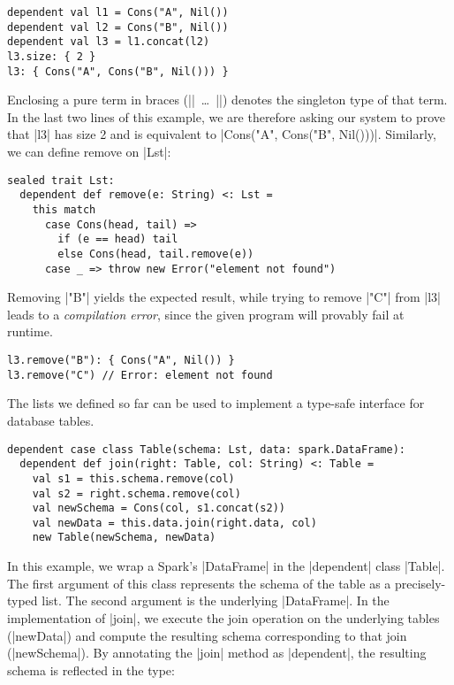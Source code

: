 \begin{lstlisting}
dependent val l1 = Cons("A", Nil())
dependent val l2 = Cons("B", Nil())
dependent val l3 = l1.concat(l2)
l3.size: { 2 }
l3: { Cons("A", Cons("B", Nil())) }
\end{lstlisting}

Enclosing a pure term in braces (|{|~\ldots{}~|}|) denotes the singleton type of that term.
In the last two lines of this example, we are therefore asking our system to prove that |l3| has size 2 and is equivalent to |Cons("A", Cons("B", Nil()))|.
Similarly, we can define remove on |Lst|:

\begin{lstlisting}
sealed trait Lst:
  dependent def remove(e: String) <: Lst =
    this match
      case Cons(head, tail) =>
        if (e == head) tail
        else Cons(head, tail.remove(e))
      case _ => throw new Error("element not found")
\end{lstlisting}

\noindent
Removing |"B"| yields the expected result, while trying to remove |"C"| from |l3| leads to a \emph{compilation error}, since the given program will provably fail at runtime.

\begin{lstlisting}
l3.remove("B"): { Cons("A", Nil()) }
l3.remove("C") // Error: element not found
\end{lstlisting}

The lists we defined so far can be used to implement a type-safe interface for database tables.

\begin{lstlisting}
dependent case class Table(schema: Lst, data: spark.DataFrame):
  dependent def join(right: Table, col: String) <: Table =
    val s1 = this.schema.remove(col)
    val s2 = right.schema.remove(col)
    val newSchema = Cons(col, s1.concat(s2))
    val newData = this.data.join(right.data, col)
    new Table(newSchema, newData)
\end{lstlisting}

\noindent
In this example, we wrap a Spark's |DataFrame| in the |dependent| class |Table|.
The first argument of this class represents the schema of the table as a precisely-typed list.
The second argument is the underlying |DataFrame|.
In the implementation of |join|, we execute the join operation on the underlying tables (|newData|) and compute the resulting schema corresponding to that join (|newSchema|).
By annotating the |join| method as |dependent|, the resulting schema is reflected in the type:

